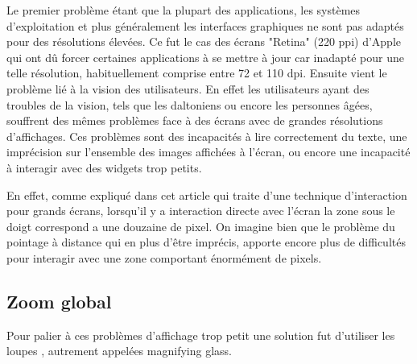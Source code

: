Le premier problème étant que la plupart des applications, les systèmes d'exploitation et plus généralement les interfaces graphiques ne sont pas adaptés pour des résolutions élevées. Ce fut le cas des écrans "Retina" (220 ppi) d'Apple qui ont dû forcer certaines applications à se mettre à jour car inadapté pour une telle résolution, habituellement comprise entre 72 et 110 dpi. Ensuite vient le problème lié à la vision des utilisateurs. En effet les utilisateurs ayant des troubles de la vision, tels que les daltoniens ou encore les personnes âgées, souffrent des mêmes problèmes face à des écrans avec de grandes résolutions d'affichages. Ces problèmes sont des incapacités à lire correctement du texte, une imprécision sur l'ensemble des images affichées à l'écran, ou encore une incapacité à interagir avec des widgets trop petits.

En effet, comme expliqué dans cet article \cite{Nancel:2013:HPL:2470654.2470773} qui traite d'une technique d'interaction pour grands écrans, lorsqu'il y a interaction directe avec l'écran la zone sous le doigt correspond a une douzaine de pixel. On imagine bien que le problème du pointage à distance qui en plus d'être imprécis, apporte encore plus de difficultés pour interagir avec une zone comportant énormément de pixels.
          
\subsection{Zoom global}


Pour palier à ces problèmes d'affichage trop petit une solution fut d'utiliser les loupes \cite{Kline:1995:IGA:223904.223919}, autrement appelées magnifying glass.

